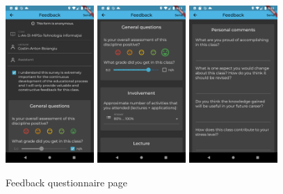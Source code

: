    \begin{figure}[!ht]
        \centering
        \begin{minipage}[t]{1.1\textwidth}
            \captionsetup{justification=centering}
            \includegraphics[width=0.3\textwidth]{figures/app/final/feedback_form_1.png}
            \includegraphics[width=0.3\textwidth]{figures/app/final/feedback_form_2.png}
            \includegraphics[width=0.3\textwidth]{figures/app/final/feedback_form_3.png}
            \caption{Feedback questionnaire page}
            \label{4:fig:feedback_form_page}
        \end{minipage}
    \end{figure}
    

